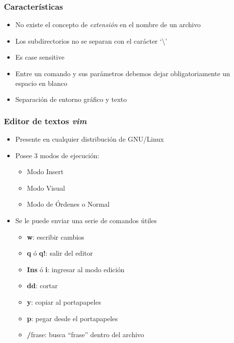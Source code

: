 \begin{frame}
  \frametitle{Características}
  \begin{itemize}
	  \item No existe el concepto de \emph{extensión} en el nombre de un archivo
	  \item Los subdirectorios no se separan con el carácter `\textbackslash'
	  \item Es case sensitive
	  \item Entre un comando y sus parámetros debemos dejar obligatoriamente un espacio en blanco
	  \item Separación de entorno gráfico y texto
  \end{itemize}
\end{frame}

\begin{frame}
  \frametitle{Editor de textos \textbf{\emph{vim}}}
  \begin{itemize}
	  \item Presente en cualquier distribución de GNU/Linux
	  \item Posee 3 modos de ejecución:
	  \begin{itemize}
	  	\item Modo Insert
	  	\item Modo Visual
	  	\item Modo de Órdenes o Normal
	  \end{itemize}
	  \item Se le puede enviar una serie de comandos útiles
	  \begin{itemize}
	  	\item \textbf{w}: escribir cambios
	  	\item \textbf{q} ó \textbf{q!}: salir del editor
	  	\item \textbf{Ins} ó \textbf{i}: ingresar al modo edición
	  	\item \textbf{dd}: cortar
	  	\item \textbf{y}: copiar al portapapeles
	  	\item \textbf{p}: pegar desde el portapapeles
	  	\item \textbf{/}frase: busca ``frase'' dentro del archivo
	  \end{itemize}
  \end{itemize}
\end{frame}

